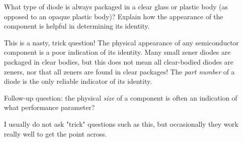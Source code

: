 

What type of diode is always packaged in a clear glass or plastic body (as opposed to an opaque plastic body)?  Explain how the appearance of the component is helpful in determining its identity.







This is a nasty, trick question!  The physical appearance of any semiconductor component is a poor indication of its identity.  Many small zener diodes are packaged in clear bodies, but this does not mean all clear-bodied diodes are zeners, nor that all zeners are found in clear packages!  The {\it part number} of a diode is the only reliable indicator of its identity.

\vskip 10pt

Follow-up question: the physical {\it size} of a component is often an indication of what performance parameter?







I usually do not ask "trick" questions such as this, but occasionally they work really well to get the point across.




